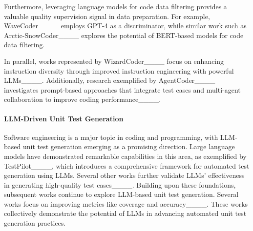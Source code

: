 Furthermore, leveraging language models for code data filtering provides a valuable quality supervision signal in data preparation. For example, WaveCoder____ employs GPT-4 as a discriminator, while similar work such as Arctic-SnowCoder____ explores the potential of BERT-based models for code data filtering.

In parallel, 
works represented by WizardCoder____ focus on enhancing instruction diversity through improved instruction engineering with powerful LLMs____.  
Additionally, research exemplified by AgentCoder____ investigates prompt-based approaches that integrate test cases and multi-agent collaboration to improve coding performance____.



\paragraph{LLM-Driven Unit Test Generation}

Software engineering is a major topic in coding and programming, with LLM-based unit test generation emerging as a promising direction. Large language models have demonstrated remarkable capabilities in this area, as exemplified by TestPilot____, which introduces a comprehensive framework for automated test generation using LLMs. 
Several other works further validate LLMs' effectiveness in generating high-quality test cases____.
Building upon these foundations, subsequent works continue to explore LLM-based unit test generation. Several works focus on improving metrics like coverage and accuracy____. 
These works collectively demonstrate the potential of LLMs in advancing automated unit test generation practices.